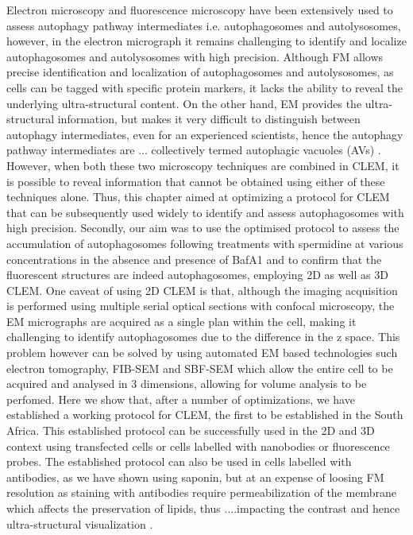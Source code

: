 Electron microscopy and fluorescence microscopy have been extensively used to assess autophagy pathway intermediates i.e. autophagosomes and autolysosomes, however, in the electron micrograph it remains challenging  to identify and localize autophagosomes and autolysosomes with high precision. Although FM allows precise identification and localization of autophagosomes and autolysosomes, as cells can be tagged with specific protein markers, it lacks the ability to reveal the underlying ultra-structural content. On the other hand, EM provides the ultra-structural information, but makes it very difficult to distinguish between autophagy intermediates, even for an experienced scientists, hence the autophagy pathway intermediates are ... collectively termed autophagic vacuoles (AVs) \citep{Eskelinen2008,klionsky2016}. However, when both these two microscopy techniques are combined in CLEM, it is possible to reveal information that cannot be obtained using either of these techniques alone. Thus, this chapter aimed at optimizing a protocol for CLEM that can be subsequently used widely to identify and assess autophagosomes with high precision. Secondly, our aim was to use the optimised protocol to assess the accumulation of autophagosomes following treatments with spermidine at various concentrations in the absence and presence of BafA1 and to confirm that the fluorescent structures are indeed autophagosomes, employing 2D as well as 3D CLEM. One caveat of using 2D CLEM is that, although the imaging acquisition is performed using multiple serial optical sections with confocal microscopy, the EM micrographs are acquired as a single plan within the cell, making it challenging to identify autophagosomes due to the difference in the z space. This problem however can be solved by using automated EM based technologies such electron tomography, FIB-SEM and SBF-SEM \citep{Burel2018,Duke2014,Russell2017,Yla-Anttila2009} which allow the entire cell to be acquired and analysed in 3 dimensions, allowing for volume analysis to be perfomed. Here we show that, after a number of optimizations, we have established a working protocol for CLEM, the first to be established in the South Africa. This established protocol can be successfully used in the 2D and 3D context using transfected cells or cells labelled with nanobodies or fluorescence probes. The established protocol can also be used in cells labelled with antibodies, as we have shown using saponin, but at an expense of loosing FM resolution as staining with antibodies require permeabilization of the membrane which affects the preservation of lipids, thus ....impacting the contrast and hence ultra-structural visualization \citep{Eskelinen2008}.

